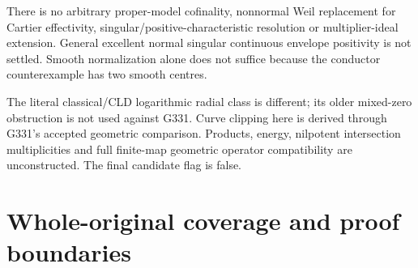 \documentclass[11pt]{article}
\begin{document}
There is no arbitrary proper-model cofinality, nonnormal Weil replacement for Cartier effectivity, singular/positive-characteristic resolution or multiplier-ideal extension. General excellent normal singular continuous envelope positivity is not settled. Smooth normalization alone does not suffice because the conductor counterexample has two smooth centres.

The literal classical/CLD logarithmic radial class is different; its older mixed-zero obstruction is not used against G331. Curve clipping here is derived through G331's accepted geometric comparison. Products, energy, nilpotent intersection multiplicities and full finite-map geometric operator compatibility are unconstructed. The final candidate flag is false.

\section{Whole-original coverage and proof boundaries}
\end{document}

